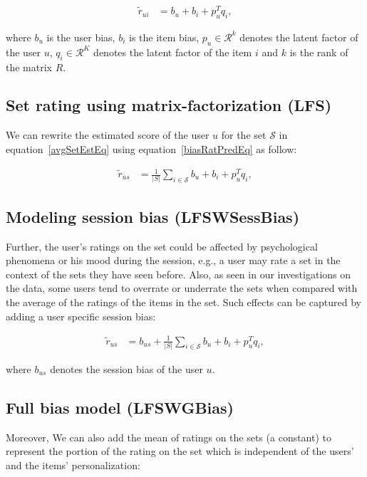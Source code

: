 \begin{equation} \label{biasRatPredEq}
  \begin{split}
    \tilde{r}_{ui} &= b_u + b_i + p_u^Tq_i, 
  \end{split}
\end{equation}


\noindent where $b_u$ is the user bias, $b_i$ is the item bias, $p_u \in \mathcal{R}^k$ denotes the latent factor of the user
$u$, $q_i \in \mathcal{R}^K$ denotes the latent factor of the item $i$ and $k$ 
is the rank of the matrix $R$.  

\subsection{Set rating using matrix-factorization (LFS)}
We can rewrite the estimated score of the user $u$ for the set $\mathcal{S}$ 
in equation~\ref{avgSetEstEq} using equation~\ref{biasRatPredEq} as follow:

\begin{equation} \label{avgSetLoEq}
  \begin{split}
    \tilde{r}_{us} &= \frac{1}{|S|} \sum_{i \in \mathcal{S}} b_u + b_i + p_u^Tq_i,
  \end{split}
\end{equation}

\subsection{Modeling session bias (LFSWSessBias)}
Further, the user's ratings on the set could be affected by psychological
phenomena or his mood during the session, e.g., a user may
rate a set in the context of the sets they have seen before. Also, as seen in our
investigations on the data, some users tend to overrate or underrate the sets
when compared with the average of the ratings of the items in the set.
Such effects can be captured by adding a user specific session bias:

\begin{equation} \label{avgSetWSessBiasEq}
  \begin{split}
    \tilde{r}_{us} &= b_{us} + \frac{1}{|S|} \sum_{i \in \mathcal{S}} b_u + b_i + p_u^Tq_i,
  \end{split}
\end{equation}

\noindent where $b_{us}$ denotes the session bias of the user $u$.


\subsection{Full bias model (LFSWGBias)}
Moreover, We can also add the mean of ratings on the sets (a constant) to represent  
the portion of the rating on the set which is independent of the users' and the
items' personalization:

